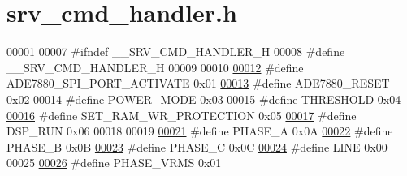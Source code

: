 \hypertarget{a00043}{\section{srv\-\_\-cmd\-\_\-handler.\-h}
\label{d6/d42/a00043}
}

\begin{DoxyCode}
00001 
00007 \textcolor{preprocessor}{#ifndef \_\_SRV\_CMD\_HANDLER\_H}
00008 \textcolor{preprocessor}{}\textcolor{preprocessor}{#define \_\_SRV\_CMD\_HANDLER\_H}
00009 \textcolor{preprocessor}{}
00010 
\hypertarget{a00043_source_l00012}{}\hyperlink{a00043_a430d76623597b550145ee76e95e84c48}{00012} \textcolor{preprocessor}{#define ADE7880\_SPI\_PORT\_ACTIVATE 0x01}
\hypertarget{a00043_source_l00013}{}\hyperlink{a00043_af6e27751df5653af1abdb5c1c505b7e1}{00013} \textcolor{preprocessor}{}\textcolor{preprocessor}{#define ADE7880\_RESET             0x02}
\hypertarget{a00043_source_l00014}{}\hyperlink{a00043_a4e7bf0c205872c6db180b06792a62118}{00014} \textcolor{preprocessor}{}\textcolor{preprocessor}{#define POWER\_MODE                0x03}
\hypertarget{a00043_source_l00015}{}\hyperlink{a00043_a4679d8ea8690999a6c6c7c0cb245c879}{00015} \textcolor{preprocessor}{}\textcolor{preprocessor}{#define THRESHOLD                 0x04}
\hypertarget{a00043_source_l00016}{}\hyperlink{a00043_a5b534b9caab512045a6e762f3930a501}{00016} \textcolor{preprocessor}{}\textcolor{preprocessor}{#define SET\_RAM\_WR\_PROTECTION     0x05}
\hypertarget{a00043_source_l00017}{}\hyperlink{a00043_a1805e103988f08b8fac817624918cf47}{00017} \textcolor{preprocessor}{}\textcolor{preprocessor}{#define DSP\_RUN                   0x06}
00018 \textcolor{preprocessor}{}
00019 
\hypertarget{a00043_source_l00021}{}\hyperlink{a00043_ad214039f52b011ce2bd6c85ff98a981b}{00021} \textcolor{preprocessor}{#define PHASE\_A           0x0A}
\hypertarget{a00043_source_l00022}{}\hyperlink{a00043_ad7b96feed1e1c12515dad5e926b2c62e}{00022} \textcolor{preprocessor}{}\textcolor{preprocessor}{#define PHASE\_B           0x0B}
\hypertarget{a00043_source_l00023}{}\hyperlink{a00043_a3ceb83fb10c2af19b468d508448f24e2}{00023} \textcolor{preprocessor}{}\textcolor{preprocessor}{#define PHASE\_C           0x0C}
\hypertarget{a00043_source_l00024}{}\hyperlink{a00043_af94cfb03461685fead1fe045d5c96f01}{00024} \textcolor{preprocessor}{}\textcolor{preprocessor}{#define LINE              0x00}
00025 \textcolor{preprocessor}{}
\hypertarget{a00043_source_l00026}{}\hyperlink{a00043_af0c09c5a455410e6fbd35fd55221338f}{00026} \textcolor{preprocessor}{#define PHASE\_VRMS          0x01}

\end{DoxyCode}
